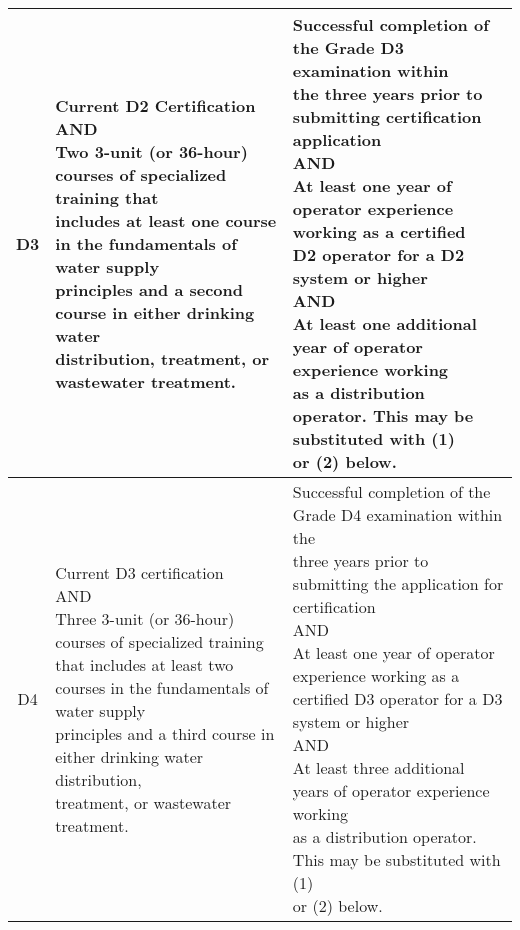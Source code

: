 \begin{table}[H]
\begin{tabular}{|c|p{7.1cm}|p{7cm}|}
\hline
D3    & \makecell[l]{Current D2 Certification\\AND\\Two 3-unit (or 36-hour) courses of specialized training that\\includes at least one course in the fundamentals of water supply\\ principles and a second course in either drinking water\\distribution, treatment, or   wastewater treatment.} & \makecell[l]{Successful completion of the Grade D3 examination within\\the three years prior to submitting certification application\\AND\\At least one year of operator experience working as a certified\\D2 operator for a D2 system or higher\\AND\\At least one additional year of operator experience working\\as a distribution operator. This may be substituted with (1)\\or (2) below.}\\ 
\hline
D4    & \makecell[l]{Current D3 certification\\ AND \\Three 3-unit (or 36-hour) courses of specialized training\\that includes at least two courses in the fundamentals of water supply\\ principles and a third course in either drinking water distribution,\\treatment, or wastewater treatment.}& \makecell[l]{Successful completion of the Grade   D4 examination within the \\three years prior to submitting the application for certification\\ AND\\ At least one year of operator experience working as a\\certified D3 operator for a D3 system or higher\\ AND\\ At least three additional years of operator experience working\\as a distribution operator. This may be substituted with (1)\\or (2) below.}\\ \hline

\end{tabular}
\end{table}
